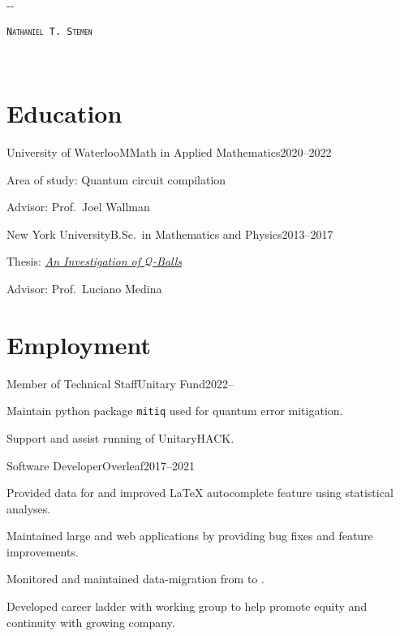 \documentclass{cultvoucher}
\begin{document}
\begin{adjustwidth}{\dimexpr-\marginparsep-\marginparwidth}{}
	\begin{center}
		\textsc{\texttt{\HUGE Nathaniel T. Stemen}}

		 \separator{}\, 
	\end{center}
\end{adjustwidth}

\section{Education}

\begin{entry}{University of Waterloo}{MMath in Applied Mathematics}{2020--2022}
	\item Area of study: Quantum circuit compilation
	\item Advisor: Prof.\ Joel Wallman
\end{entry}

\begin{entry}{New York University}{B.Sc.\ in Mathematics and Physics}{2013--2017}
	\item Thesis: \href{https://natestemen.xyz/qv-thesis.pdf}{\textit{An Investigation of $\mathcal{Q}$-Balls}}
	\item Advisor: Prof.\ Luciano Medina
\end{entry}

\section{Employment}

\begin{entry}{Member of Technical Staff}{Unitary Fund}{2022--}
	\item Maintain python package \texttt{mitiq} used for quantum error mitigation.
	\item Support and assist running of UnitaryHACK.
\end{entry}

\begin{entry}{Software Developer}{Overleaf}{2017--2021}
	\item Provided data for and improved \LaTeX{} autocomplete feature using statistical analyses.
	\item Maintained large  and  web applications by providing bug fixes and feature improvements.
	\item Monitored and maintained data-migration from  to .
	\item Developed career ladder with working group to help promote equity and continuity with growing company.
\end{entry}
\end{document}
